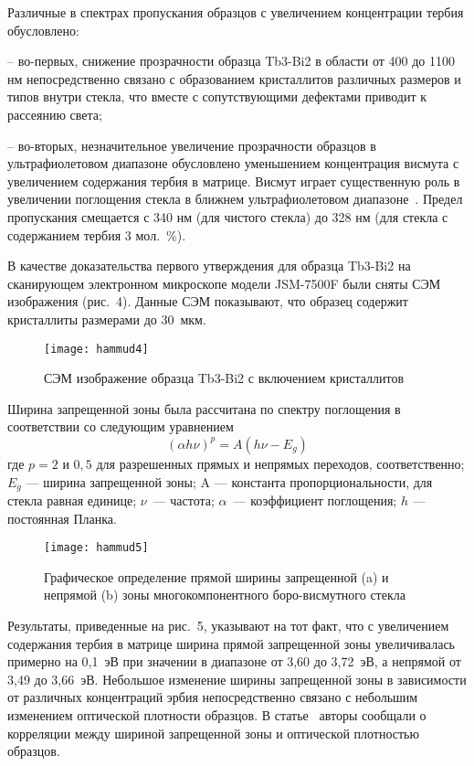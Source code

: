 \documentclass[press]{vestnik}
\begin{document}
Различные в спектрах пропускания образцов с увеличением концентрации тербия 
обусловлено:

-- во-первых, снижение прозрачности образца Tb3-Bi2 в области от 400 до 1100 нм 
непосредственно связано с образованием кристаллитов различных размеров и 
типов внутри стекла, что вместе с сопутствующими дефектами приводит к 
рассеянию света;

-- во-вторых, незначительное увеличение прозрачности образцов в 
ультрафиолетовом диапазоне обусловлено уменьшением концентрация висмута с 
увеличением содержания тербия в матрице. Висмут играет существенную роль в 
увеличении поглощения стекла в ближнем ультрафиолетовом диапазоне~\cite{B07,B14}. 
Предел пропускания смещается с 340 нм (для чистого стекла) до 328 нм (для 
стекла с содержанием тербия 3 мол.~{\%}).

В качестве доказательства первого утверждения для образца Tb3-Bi2 на 
сканирующем электронном микроскопе модели JSM-7500F были сняты СЭМ 
изображения (рис.~4). Данные СЭМ показывают, что образец содержит кристаллиты 
размерами до 30~мкм.

\begin{figure}[htbp]
\centerline{\texttt{[image: hammud4]}}
\caption{СЭМ изображение образца Tb3-Bi2 с включением кристаллитов}
\label{fig4}
\end{figure}

Ширина запрещенной зоны была рассчитана по спектру поглощения в соответствии 
со следующим уравнением~\cite{B15,B16}
\[
\left( \alpha h\nu \right)^{p}=A\left( h\nu -E_{g} \right)
\]
где $p=2$ и $0,5$ для разрешенных прямых и непрямых переходов, 
соответственно; $E_{g}$ --- ширина запрещенной зоны; A --- константа 
пропорциональности, для стекла равная единице; $\nu $~--- частота; $\alpha $~--- 
коэффициент поглощения; $h$ --- постоянная Планка.

\begin{figure}
\centerline{\texttt{[image: hammud5]}}
\caption{Графическое определение прямой ширины запрещенной (a) и непрямой (b) 
зоны многокомпонентного боро-висмутного стекла}
\label{fig5}
\end{figure}

Результаты, приведенные на рис.~5, указывают на тот факт, что с увеличением 
содержания тербия в матрице ширина прямой запрещенной зоны увеличивалась 
примерно на 0,1~эВ при значении в диапазоне от 3,60 до 3,72~эВ, а непрямой 
от 3,49 до 3,66~эВ. Небольшое изменение ширины запрещенной зоны в 
зависимости от различных концентраций эрбия непосредственно связано с 
небольшим изменением оптической плотности образцов. В статье~\cite{B20} авторы 
сообщали о корреляции между шириной запрещенной зоны и оптической плотностью 
образцов.
\end{document}
